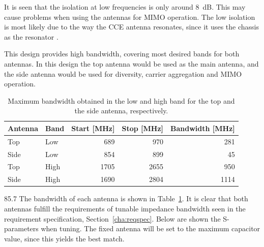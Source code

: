 It is seen that the isolation at low frequencies is only around \SI{8}{dB}. This may cause problems when using the antennas for MIMO operation. The low isolation is most likely due to the way the CCE antenna resonates, since it uses the chassis as the resonator  \cite{ilvonen2014design}.


This design provides high bandwidth, covering most desired bands for both antennas. In this design the top antenna would be used as the main antenna, and the side antenna would be used for diversity, carrier aggregation and MIMO operation. 

\begin{table}[htbp]
    \centering
    \begin{tabular}{|l|l|r|r|r|}
        \hline
        Antenna & Band & Start [MHz] & Stop [MHz] & Bandwidth [MHz] \\
        \hline
        Top     & Low  & 689         & 970       & 281 \\
        Side    & Low  & 854         & 899        & 45 \\
        \hline
        Top     & High & 1705        & 2655       & 950 \\
        Side    & High & 1690        & 2804       & 1114 \\
        \hline
    \end{tabular}
    \caption{Maximum bandwidth obtained in the low and high band for the top and the side antenna, respectively.}
    \label{tab:bw_sol3}
\end{table}
85.7
The bandwidth of each antenna is shown in Table~\ref{tab:bw_sol3}. It is clear that both antennas fulfill the requirements of tunable impedance bandwidth seen in the requirement specification, Section~\ref{cha:reqspec}. Below are shown the S-parameters when tuning. The fixed antenna will be set to the maximum capacitor value, since this yields the best match.  

